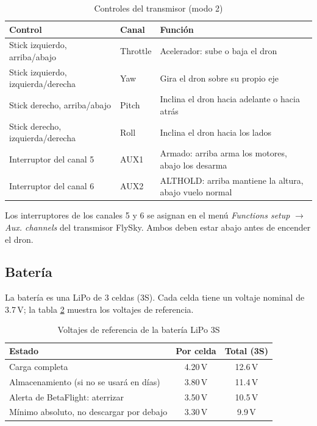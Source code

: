 \documentclass[11pt,letterpaper]{article}
\begin{document}
\begin{table}[!ht]
\centering
\caption{Controles del transmisor (modo 2)}
\label{tab:controles}
\begin{tabularx}{\textwidth}{@{}llX@{}}
\toprule
\textbf{Control} & \textbf{Canal} & \textbf{Función} \\
\midrule
Stick izquierdo, arriba/abajo & Throttle & Acelerador: sube o baja el dron \\
Stick izquierdo, izquierda/derecha & Yaw & Gira el dron sobre su propio eje \\
Stick derecho, arriba/abajo & Pitch & Inclina el dron hacia adelante o hacia atrás \\
Stick derecho, izquierda/derecha & Roll & Inclina el dron hacia los lados \\
Interruptor del canal 5 & AUX1 & Armado: arriba arma los motores, abajo los desarma \\
Interruptor del canal 6 & AUX2 & ALTHOLD: arriba mantiene la altura, abajo vuelo normal \\
\bottomrule
\end{tabularx}
\end{table}

Los interruptores de los canales 5 y 6 se asignan en el menú \textit{Functions setup} $\rightarrow$ \textit{Aux. channels} del transmisor FlySky. Ambos deben estar abajo antes de encender el dron.

\subsection{Batería}
La batería es una LiPo de 3 celdas (3S). Cada celda tiene un voltaje nominal de 3.7\,V; la tabla \ref{tab:bateria} muestra los voltajes de referencia.

\begin{table}[!ht]
\centering
\caption{Voltajes de referencia de la batería LiPo 3S}
\label{tab:bateria}
\begin{tabular}{@{}lcc@{}}
\toprule
\textbf{Estado} & \textbf{Por celda} & \textbf{Total (3S)} \\
\midrule
Carga completa & 4.20\,V & 12.6\,V \\
Almacenamiento (si no se usará en días) & 3.80\,V & 11.4\,V \\
Alerta de BetaFlight: aterrizar & 3.50\,V & 10.5\,V \\
Mínimo absoluto, no descargar por debajo & 3.30\,V & 9.9\,V \\
\bottomrule
\end{tabular}
\end{table}
\end{document}
